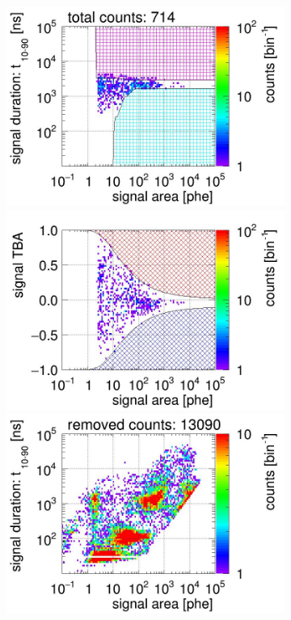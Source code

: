 \begin{landscape}
\begin{figure}[!p]
\begin{subfigure}[t]{0.32\textwidth}
			\includegraphics[width=\figurewidth,clip,trim={0 98 0 15}]{Figures/GasTest/CutsValid/res64766/pdpa23Vecfig64766.jpg}
			\includegraphics[width=\figurewidth,clip,trim={0 98 0 40}]{Figures/GasTest/CutsValid/res64766/tbapa23Vecfig64766.jpg}
			\includegraphics[width=\figurewidth,clip,trim={0 98 0 15}]{Figures/GasTest/CutsValid/res64766/pdpaX23Vecfig64766.jpg}

\end{subfigure}
\end{figure}
\end{landscape}
